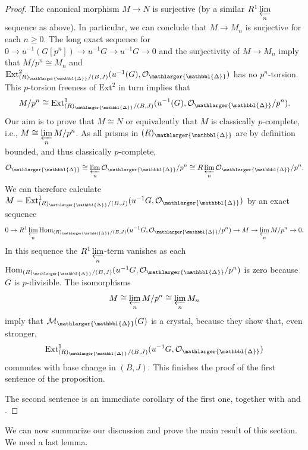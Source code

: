 \documentclass{amsart}
\newcommand{\prism}{{\mathlarger{\mathbbl{\Delta}}}}
\theoremstyle{plain}
\theoremstyle{definition}
\newcommand{\red}[1]{{\color{black} #1}}
\begin{document}
\begin{proof}
          The canonical morphism $M\to N$ is surjective (by a similar $R^1\varprojlim\limits_{n}$ sequence as above). In particular, we can conclude that $M\to M_n$ is surjective for each $n\geq 0$. The long exact sequence for $0\to u^{-1}(G[p^n])\to u^{-1}G\to u^{-1}G\to 0$ and the surjectivity of $M\to M_n$ imply that $M/p^n\cong M_n$ and $\mathrm{Ext}^{2}_{{(R)_{\prism}/(B,J)}}(u^{-1}(G),\mathcal{O}_{\prism})$ has no $p^n$-torsion. This $p$-torsion freeness of $\mathrm{Ext}^2$ in turn implies that
          $$
          M/p^n\cong \mathrm{Ext}^1_{(R)_\prism/(B,J)}(u^{-1}(G),\mathcal{O}_{\prism}/p^n).
          $$
          Our aim is to prove that $M\cong N$ or equivalently that $M$ is classically $p$-complete, i.e., $M\cong \varprojlim\limits_{n} M/p^n$.
          As all prisms in $(R)_{\prism}$ are by definition bounded, and thus classically $p$-complete,
          $$
          \mathcal{O}_{\prism}\cong \varprojlim\limits_{n} \mathcal{O}_{\prism}/p^n\cong R\varprojlim\limits_{n} \mathcal{O}_\prism/p^n.
          $$
          We can therefore calculate $M=\mathrm{Ext}^1_{(R)_\prism/(B,J)}(u^{-1}G,\mathcal{O}_\prism)$ by an exact sequence
          $$
          0\to R^1\varprojlim\limits_{n} \mathrm{Hom}_{(R)_\prism/(B,J)}(u^{-1}G,\mathcal{O}_\prism/p^n)\to M\to \varprojlim\limits_nM/p^n\to 0.
          $$
          In this sequence the $R^1\varprojlim\limits_{n}$-term vanishes as each $\mathrm{Hom}_{(R)_\prism/(B,J)}(u^{-1}G,\mathcal{O}_\prism/p^n)$ is zero because $G$ is $p$-divisible.
          \red{The isomorphisms}
          $$
          M\cong \varprojlim\limits_{n} M/p^n \cong \varprojlim\limits_n M_n
          $$
          \red{imply} that $\mathcal{M}_{\prism}(G)$ is a crystal, because they show that, even stronger,
          $$
          \mathrm{Ext}^1_{(R)_\prism/(B,J)}(u^{-1}G,\mathcal{O}_\prism)
          $$
          commutes with base change in $(B,J)$. This finishes the proof of the first sentence of the proposition. 
          
          The second sentence is an immediate corollary of the first one, together with  and .
	      \end{proof}
      
We can now summarize our discussion and prove the main result of this section. We need a last lemma.
\end{document}
